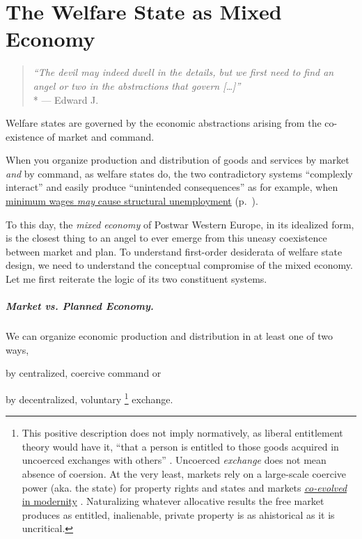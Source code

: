 
\chapter[Mixed Economy]{The Welfare State as Mixed Economy} \label{chap:mixed-economy}

\begin{quote}
	\emph{``The devil may indeed dwell in the details, but we first need to find an angel or two in the abstractions that govern [\ldots]''}\\*
	--- Edward J. \cite[K117]{McCaffery2002}
\end{quote}

Welfare states are governed by the economic abstractions arising from the co-existence of market and command.

When you organize production and distribution of goods and services by market \emph{and} by command, as welfare states do, the two contradictory systems ``complexly interact'' \citep{Perrow-1999-aa} and easily produce ``unintended consequences'' \citep{Merton-1936-aa} as for example, when \hyperref[sec:price-floors]{minimum wages \emph{may} cause structural unemployment} (p.~\pageref{sec:price-floors}).

To this day, the \emph{mixed economy} of Postwar Western Europe, in its idealized form, is the closest thing to an angel to ever emerge from this uneasy coexistence between market and plan. 
To understand first-order desiderata of welfare state design, we need to understand the conceptual compromise of the mixed economy. 
Let me first reiterate the logic of its two constituent systems.

\paragraph[Market vs. Plan]{Market vs. Planned Economy.}  \label{sec:market-vs-command} 

We can organize economic production and distribution in at least one of two ways, 
\begin{inparaenum}
	\item 
		by centralized, coercive command or
	\item 
		by decentralized, voluntary
		\footnote{
			\label{fn:tilly} This positive description does not imply normatively, as liberal entitlement theory would have it, ``that a person is entitled to those goods acquired in uncoerced exchanges with others'' \citep[149]{Nozick1974,Friedman1962}. 
			Uncoerced \emph{exchange} does not mean absence of coersion. 
			At the very least, markets rely on a large-scale coercive power (aka. the state) for property rights and states and markets \hyperref[sec:modernity]{\emph{co-evolved} in modernity} \citep{Tilly-1985-aa}. 
			Naturalizing whatever allocative results the free market produces as entitled, inalienable, private property is as ahistorical as it is uncritical.
		} %
		exchange. 
\end{inparaenum}
 
